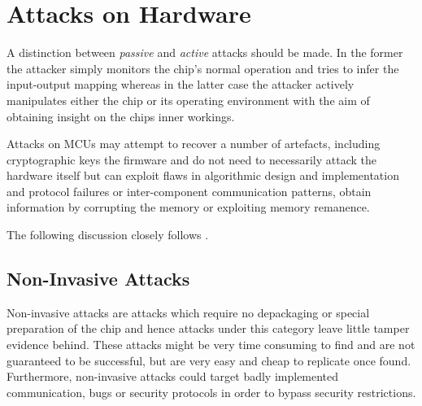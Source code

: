 \section{Attacks on Hardware}
\label{sec:curr_attacks}
A distinction between \emph{passive} and \emph{active} attacks should be made. In the former the attacker simply monitors the chip's normal operation and tries to infer the input-output mapping whereas in the latter case the attacker actively manipulates either the chip or its operating environment with the aim of obtaining insight on the chips inner workings. 

Attacks on MCUs may attempt to recover a number of artefacts, including cryptographic keys the firmware and do not need to necessarily attack the hardware itself but can exploit flaws in algorithmic design and implementation and protocol failures or inter-component communication patterns\citep{anderson:cautionary_note}\citep{kocher:DPA}, obtain information by corrupting the memory or exploiting memory remanence\citep{sergei:thesis}\citep{gutman:memory_remanence}.

The following discussion closely follows \citep{sergei:thesis}.

	\subsection{Non-Invasive Attacks}
	Non-invasive attacks are attacks which require no depackaging or special preparation of the chip and hence attacks under this category leave little tamper evidence behind. These attacks might be very time consuming to find and are not guaranteed to be successful, but are very easy and cheap to replicate once found. Furthermore, non-invasive attacks could target badly implemented communication, bugs or security protocols in order to bypass security restrictions.
	

